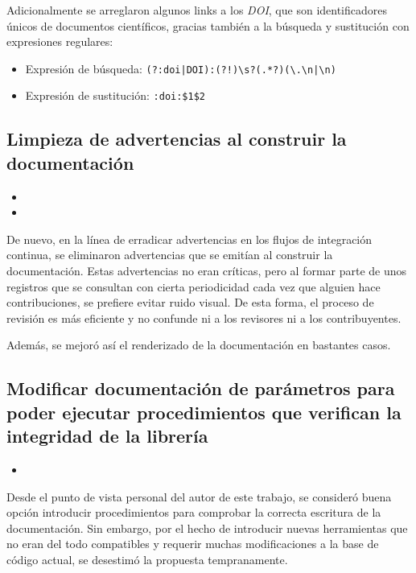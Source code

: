 Adicionalmente se arreglaron algunos links a los \textit{DOI}, que son identificadores únicos de documentos científicos, gracias también a la búsqueda y sustitución con expresiones regulares:

\begin{itemize}
    \item Expresión de búsqueda: \texttt{(?:doi|DOI):(?!\textasciigrave{})\textbackslash s?(.*?)(\textbackslash .\textbackslash n|\textbackslash n)}
\end{itemize}
\begin{itemize}
    \item Expresión de sustitución: \texttt{:doi:\textasciigrave{}\$1\textasciigrave{}\$2}
\end{itemize}

\subsection{Limpieza de advertencias al construir la documentación}

\begin{itemize}
    \item {}
    \item {}
\end{itemize}

De nuevo, en la línea de erradicar advertencias en los flujos de integración continua, se eliminaron advertencias que se emitían al construir la documentación. Estas advertencias no eran críticas, pero al formar parte de unos registros que se consultan con cierta periodicidad cada vez que alguien hace contribuciones, se prefiere evitar ruido visual. De esta forma, el proceso de revisión es más eficiente y no confunde ni a los revisores ni a los contribuyentes.

Además, se mejoró así el renderizado de la documentación en bastantes casos.

\subsection{Modificar documentación de parámetros para poder ejecutar procedimientos que verifican la integridad de la librería}

\begin{itemize}
    \item {}
\end{itemize}

Desde el punto de vista personal del autor de este trabajo, se consideró buena opción introducir procedimientos para comprobar la correcta escritura de la documentación. Sin embargo, por el hecho de introducir nuevas herramientas que no eran del todo compatibles y requerir muchas modificaciones a la base de código actual, se desestimó la propuesta tempranamente.

